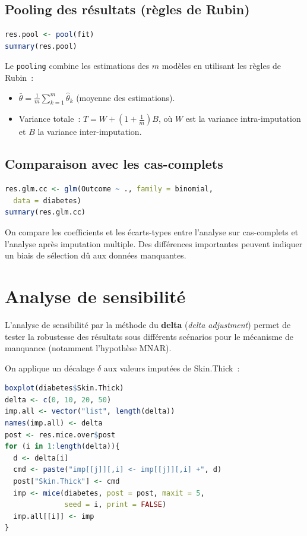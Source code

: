 \documentclass[a4paper,11pt]{article}
\theoremstyle{definition}
\theoremstyle{remark}
\begin{document}
\subsection{Pooling des r\'esultats (r\`egles de Rubin)}

\begin{lstlisting}[language=R]
res.pool <- pool(fit)
summary(res.pool)
\end{lstlisting}

Le \texttt{pooling} combine les estimations des $m$ mod\`eles en
utilisant les r\`egles de Rubin~:
\begin{itemize}
  \item $\bar{\theta} = \frac{1}{m}\sum_{k=1}^m \hat{\theta}_k$
    (moyenne des estimations).
  \item Variance totale~: $T = W + (1 + \frac{1}{m})B$, o\`u $W$
    est la variance intra-imputation et $B$ la variance
    inter-imputation.
\end{itemize}

\subsection{Comparaison avec les cas-complets}

\begin{lstlisting}[language=R]
res.glm.cc <- glm(Outcome ~ ., family = binomial,
  data = diabetes)
summary(res.glm.cc)
\end{lstlisting}

On compare les coefficients et les \'ecarts-types entre l'analyse
sur cas-complets et l'analyse apr\`es imputation multiple. Des
diff\'erences importantes peuvent indiquer un biais de s\'election
d\^u aux donn\'ees manquantes.

\section{Analyse de sensibilit\'e}

L'analyse de sensibilit\'e par la m\'ethode du \textbf{delta}
(\emph{delta adjustment}) permet de tester la robustesse des
r\'esultats sous diff\'erents sc\'enarios pour le m\'ecanisme de
manquance (notamment l'hypoth\`ese MNAR).

On applique un d\'ecalage $\delta$ aux valeurs imput\'ees de
Skin.Thick~:

\begin{lstlisting}[language=R]
boxplot(diabetes$Skin.Thick)
delta <- c(0, 10, 20, 50)
imp.all <- vector("list", length(delta))
names(imp.all) <- delta
post <- res.mice.over$post
for (i in 1:length(delta)){
  d <- delta[i]
  cmd <- paste("imp[[j]][,i] <- imp[[j]][,i] +", d)
  post["Skin.Thick"] <- cmd
  imp <- mice(diabetes, post = post, maxit = 5,
              seed = i, print = FALSE)
  imp.all[[i]] <- imp
}
\end{lstlisting}
\end{document}
